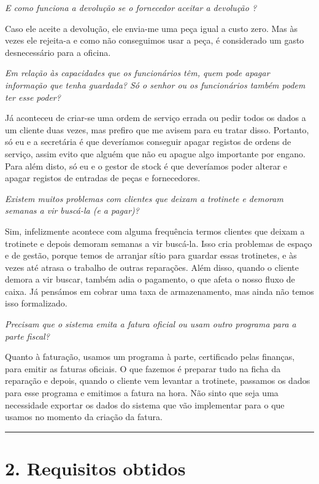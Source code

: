 \documentclass[11pt,a4paper]{article}
\newcommand{\pergunta}[1]{\item[P:] \textit{#1}}
\newcommand{\resposta}[1]{\item[R:] #1}
\begin{document}
\begin{transcription}
		\pergunta{E como funciona a devolução se o fornecedor aceitar a devolução ?}
		\resposta{Caso ele aceite a devolução, ele envia-me uma peça igual a custo zero. Mas às vezes ele rejeita-a e como não conseguimos usar a peça, é considerado um gasto desnecessário para a oficina.}
		
		\pergunta{Em relação às capacidades que os funcionários têm, quem pode apagar informação que tenha guardada? Só o senhor ou os funcionários também podem ter esse poder?}
		\resposta{Já aconteceu de criar-se uma ordem de serviço errada ou pedir todos os dados a um cliente duas vezes, mas prefiro que me avisem para eu tratar disso. Portanto, só eu e a secretária é que deveríamos conseguir apagar registos de ordens de serviço, assim evito que alguém que não eu apague algo importante por engano. Para além disto, só eu e o gestor de stock é que deveríamos poder alterar e apagar registos de entradas de peças e fornecedores.}
		
		\pergunta{Existem muitos problemas com clientes que deixam a trotinete e demoram semanas a vir buscá-la (e a pagar)?}
		\resposta{Sim, infelizmente acontece com alguma frequência termos clientes que deixam a trotinete e depois demoram semanas a vir buscá-la. Isso cria problemas de espaço e de gestão, porque temos de arranjar sítio para guardar essas trotinetes, e às vezes até atrasa o trabalho de outras reparações. Além disso, quando o cliente demora a vir buscar, também adia o pagamento, o que afeta o nosso fluxo de caixa. Já pensámos em cobrar uma taxa de armazenamento, mas ainda não temos isso formalizado.}
		
		\pergunta{Precisam que o sistema emita a fatura oficial ou usam outro programa para a parte fiscal?}	
		\resposta{Quanto à faturação, usamos um programa à parte, certificado pelas finanças, para emitir as faturas oficiais. O que fazemos é preparar tudo na ficha da reparação e depois,	quando o cliente vem levantar a trotinete, passamos os dados para esse programa e emitimos a fatura na hora. Não sinto que seja uma necessidade exportar os dados do sistema que vão implementar para o que usamos no momento da criação da fatura.}
		
	\end{transcription}
	\vspace{0.5cm}
	
	\hrule %
	\vspace{0.2cm}
	
	\section*{2. Requisitos obtidos}
	
\end{document}
